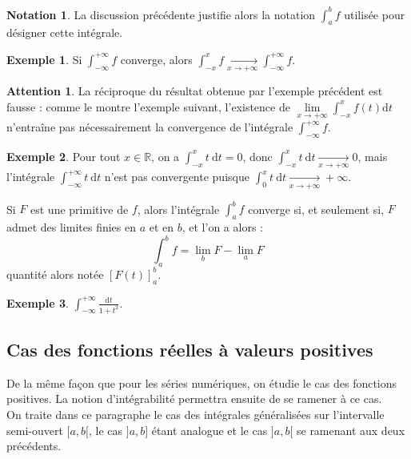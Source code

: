 \documentclass[french]{article}
\newcommand{\R}{\mathbb{R}}
\renewcommand{\d}{\text{d}}
\theoremstyle{plain}
\theoremstyle{definition}
\newtheorem*{ex}{Exemple}
\newtheorem*{notation}{Notation}
\newtheorem*{attention}{Attention}
\theoremstyle{remark}
\begin{document}
\begin{notation}
	La discussion précédente justifie alors la notation $\displaystyle\int_{a}^{b}f$ utilisée pour désigner cette intégrale.
\end{notation}

\begin{ex}
	Si $\displaystyle\int_{-\infty}^{+\infty}f$ converge, alors $\displaystyle\int_{-x}^{x}f\xrightarrow[x\to+\infty]{}\int_{-\infty}^{+\infty}f$.
\end{ex}

\begin{attention}
	La réciproque du résultat obtenue par l'exemple précédent est fausse : comme le montre l'exemple suivant, l'existence de $\displaystyle\underset{x\to+\infty}{\lim}\int_{-x}^{x}f(t)\d t$ n'entraîne pas nécessairement la convergence de l'intégrale $\displaystyle\int_{-\infty}^{+\infty}f$.
\end{attention}

\begin{ex}
	Pour tout $x\in\R$, on a $\displaystyle\int_{-x}^{x}t\ \d t=0$, donc $\displaystyle\int_{-x}^{x}t\ \d t\xrightarrow[x\to+\infty]{}0$, mais l'intégrale $\displaystyle\int_{-\infty}^{+\infty}t\ \d t$ n'est pas convergente puisque $\displaystyle\int_{0}^{x}t\ \d t\xrightarrow[x\to+\infty]{}+\infty$.
\end{ex}

\begin{met}
	Si $F$ est une primitive de $f$, alors l'intégrale $\displaystyle\int_{a}^{b}f$ converge si, et seulement si, $F$ admet des limites finies en $a$ et en $b$, et l'on a alors : $$\int_{a}^{b}f=\lim_{b}F-\lim_{a}F$$ quantité alors notée $[F(t)]_a^b$.
\end{met}

\begin{ex}
	$\displaystyle\int_{-\infty}^{+\infty}\frac{\d t}{1+t^2}$.
\end{ex}

\subsection{Cas des fonctions réelles à valeurs positives}

De la même façon que pour les séries numériques, on étudie le cas des fonctions positives. La notion d'intégrabilité permettra ensuite de se ramener à ce cas.\\
On traite dans ce paragraphe le cas des intégrales généralisées sur l'intervalle semi-ouvert $[a,b[$, le cas $]a,b]$ étant analogue et le cas $]a,b[$ se ramenant aux deux précédents.
\end{document}
